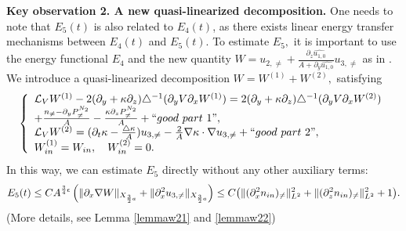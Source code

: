 \documentclass[12pt, reqno]{amsart}
\numberwithin{equation}{section}
\begin{document}
	{\bf Key observation 2. A  new quasi-linearized decomposition.} One needs to note that $E_5(t)$ is also related to $E_4(t)$, as there exists linear energy transfer mechanisms between $E_4(t)$ and $E_5(t).$
	To estimate $E_5,$ it is important to
	use the energy functional $E_4$ and the new quantity $W=u_{2,\neq}+ \frac{\partial_z\widehat{u_{1,0}}}{A+\partial_y\widehat{u_{1,0}}} u_{3,\neq}$ as in \cite{wei2}.
	We introduce a quasi-linearized decomposition $W=W^{(1)}+W^{(2)},$
	satisfying 
	\begin{equation*}
		\left\{
		\begin{array}{lr}
			\mathcal{L}_VW^{(1)}
			-2(\partial_y+\kappa\partial_z)
			\triangle^{-1}(\partial_yV\partial_xW^{(1)})
			=2(\partial_y+\kappa\partial_z)\triangle^{-1}
			(\partial_yV\partial_xW^{(2)})
			\\
			+\frac{n_{\neq}-\partial_yP^{N_2}_{\neq}}{A}-\frac{\kappa\partial_zP^{N_2}_{\neq}}{A}+``{\rm  good~part~1}",\\
			\mathcal{L}_VW^{(2)}
			=(\partial_t\kappa-\frac{\triangle\kappa}{A})u_{3,\neq}
			-\frac{2}{A}\nabla\kappa\cdot\nabla u_{3,\neq}+``{\rm  good~part~2}",\\
			W^{(1)}_{\rm in}=W_{\rm in},~~~ W^{(2)}_{\rm in}=0.
		\end{array}
		\right.
	\end{equation*}	
	In this way, we can  estimate $E_5$ directly without any other auxiliary terms: 
	$$E_{5}(t)\leq C
	A^{\frac{3}{4}\epsilon}
	\left(\|\partial_x\nabla W\|_{X_{\frac{3}{2}a}}+
	\|\partial_{x}^2u_{3,\neq}\|_{X_{\frac{3}{2}a}}\right)
	\leq C\big(\|(\partial_x^2n_{\rm in})_{\neq}\|^2_{L^2}
	+\|(\partial_z^2n_{\rm in})_{\neq}\|^2_{L^2}+1\big).$$
	(More details, see Lemma \ref{lemmaw21} and \ref{lemmaw22})	
\end{document}

